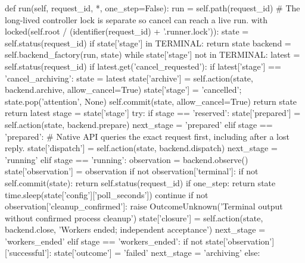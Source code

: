     def run(self, request_id, *, one_step=False):
        run = self.path(request_id)
        # The long-lived controller lock is separate so cancel can reach a live run.
        with locked(self.root / (identifier(request_id) + '.runner.lock')):
            state = self.status(request_id)
            if state['stage'] in TERMINAL:
                return state
            backend = self.backend_factory(run, state)
            while state['stage'] not in TERMINAL:
                latest = self.status(request_id)
                if latest.get('cancel_requested'):
                    if latest['stage'] == 'cancel_archiving':
                        state = latest
                        state['archive'] = self.action(state, backend.archive, allow_cancel=True)
                        state['stage'] = 'cancelled'; state.pop('attention', None)
                        self.commit(state, allow_cancel=True)
                        return state
                    return latest
                stage = state['stage']
                try:
                    if stage == 'reserved':
                        state['prepared'] = self.action(state, backend.prepare)
                        next_stage = 'prepared'
                    elif stage == 'prepared':
                        # Native API queries the exact request first, including after a lost reply.
                        state['dispatch'] = self.action(state, backend.dispatch)
                        next_stage = 'running'
                    elif stage == 'running':
                        observation = backend.observe()
                        state['observation'] = observation
                        if not observation['terminal']:
                            if not self.commit(state):
                                return self.status(request_id)
                            if one_step:
                                return state
                            time.sleep(state['config']['poll_seconds'])
                            continue
                        if not observation['cleanup_confirmed']:
                            raise OutcomeUnknown('Terminal output without confirmed process cleanup')
                        state['closure'] = self.action(state, backend.close, 'Workers ended; independent acceptance')
                        next_stage = 'workers_ended'
                    elif stage == 'workers_ended':
                        if not state['observation']['successful']:
                            state['outcome'] = 'failed'
                            next_stage = 'archiving'
                        else:
